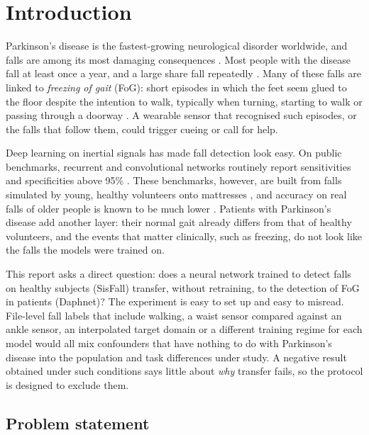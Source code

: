 \chapter{Introduction}
\label{ch:intro}

Parkinson's disease is the fastest-growing neurological disorder worldwide, and falls are among its
most damaging consequences \parencite{gbd2024nervous,bloem2021parkinson}. Most people with the disease
fall at least once a year, and a large share fall repeatedly \parencite{allen2013falls}. Many of these
falls are linked to \emph{freezing of gait} (FoG): short episodes in which the feet seem glued to the
floor despite the intention to walk, typically when turning, starting to walk or passing through a
doorway \parencite{nutt2011fog}. A wearable sensor that recognised such episodes, or the falls that
follow them, could trigger cueing or call for help.

Deep learning on inertial signals has made fall detection look easy. On public benchmarks, recurrent
and convolutional networks routinely report sensitivities and specificities above 95\%
\parencite{musci2021online,wang2019survey}. These benchmarks, however, are built from falls simulated by
young, healthy volunteers onto mattresses \parencite{sucerquia2017sisfall,casilari2017datasets}, and
accuracy on real falls of older people is known to be much lower \parencite{bagala2012realfalls}. Patients
with Parkinson's disease add another layer: their normal gait already differs from that of healthy
volunteers, and the events that matter clinically, such as freezing, do not look like the falls the
models were trained on.

This report asks a direct question: does a neural network trained to detect falls on healthy
subjects (SisFall) transfer, without retraining, to the detection of FoG in patients (Daphnet)? The
experiment is easy to set up and easy to misread. File-level fall labels that include walking, a
waist sensor compared against an ankle sensor, an interpolated target domain or a different training
regime for each model would all mix confounders that have nothing to do with Parkinson's disease into
the population and task differences under study. A negative result obtained under such conditions
says little about \emph{why} transfer fails, so the protocol is designed to exclude them.

\section{Problem statement}

